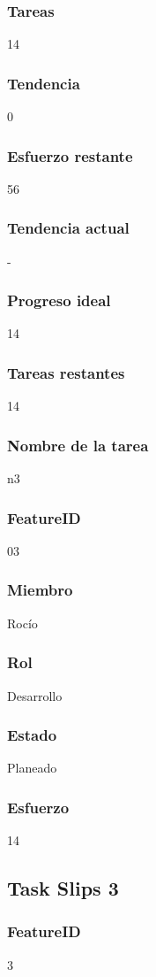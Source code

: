 \subsubsection{Tareas}
14
\subsubsection{Tendencia}
0
\subsubsection{Esfuerzo restante}
56
\subsubsection{Tendencia actual}
-
\subsubsection{Progreso ideal}
14
\subsubsection{Tareas restantes}
14
\subsubsection{Nombre de la tarea}
n3
\subsubsection{FeatureID}
03
\subsubsection{Miembro}
Rocío
\subsubsection{Rol}
Desarrollo
\subsubsection{Estado}
Planeado
\subsubsection{Esfuerzo}
14

\subsection{Task Slips 3}


\subsubsection{FeatureID}3
